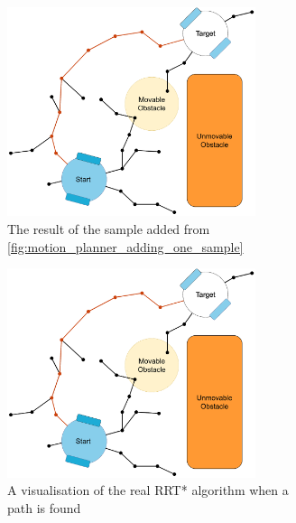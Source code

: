 \begin{figure}[H]
    \centering
    \begin{subfigure}{.5\textwidth}
    \centering
    \includegraphics[width=0.8\textwidth]{figures/mp/7mp_path_found.png}
    \caption{The result of the sample added from \cref{fig:motion_planner_adding_one_sample}}
    \label{subfig:}
    \end{subfigure}%
    \begin{subfigure}{.5\textwidth}
    \centering
    \includegraphics[width=0.8\textwidth]{figures/mp/7mp_path_found.png}
    \caption{A visualisation of the real \acs{RRT*} algorithm when a path is found}
    \label{subfig:}
    \end{subfigure}
    \caption{}
    \label{fig:}
\end{figure}





